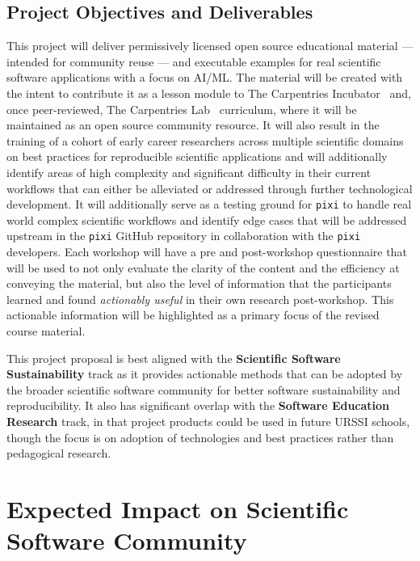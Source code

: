 \documentclass[letterpaper, 11pt]{article}
\newcommand{\program}{URSSI}
\newcommand{\pixi}{\texttt{pixi}}
\begin{document}
\subsection{Project Objectives and Deliverables}
This project will deliver permissively licensed open source educational material --- intended for community reuse --- and executable examples for real scientific software applications with a focus on AI/ML.
The material will be created with the intent to contribute it as a lesson module to The Carpentries Incubator~\cite{carpentries_incubator_proposals} and, once peer-reviewed, The Carpentries Lab~\cite{carpentries_lab} curriculum, where it will be maintained as an open source community resource.
It will also result in the training of a cohort of early career researchers across multiple scientific domains on best practices for reproducible scientific applications and will additionally identify areas of high complexity and significant difficulty in their current workflows that can either be alleviated or addressed through further technological development.
It will additionally serve as a testing ground for \pixi{} to handle real world complex scientific workflows and identify edge cases that will be addressed upstream in the \pixi{} GitHub repository in collaboration with the \pixi{} developers.
Each workshop will have a pre and post-workshop questionnaire that will be used to not only evaluate the clarity of the content and the efficiency at conveying the material, but also the level of information that the participants learned and found \emph{actionably useful} in their own research post-workshop.
This actionable information will be highlighted as a primary focus of the revised course material.

This project proposal is best aligned with the \textbf{Scientific Software Sustainability} track as it provides actionable methods that can be adopted by the broader scientific software community for better software sustainability and reproducibility.
It also has significant overlap with the \textbf{Software Education Research} track, in that project products could be used in future \program{} schools, though the focus is on adoption of technologies and best practices rather than pedagogical research.
%

\section{Expected Impact on Scientific Software Community}
\end{document}
